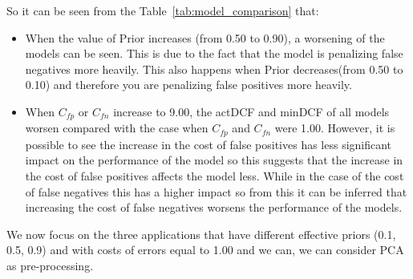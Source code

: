 \documentclass{article}
\begin{document}
    So it can be seen from the Table~\ref{tab:model_comparison} that:
    \begin{itemize}
        \item When the value of Prior increases (from 0.50 to 0.90), a worsening of the models can be seen. This is due to the fact that the model is penalizing false negatives more heavily. This also happens when Prior decreases(from 0.50 to 0.10) and therefore you are penalizing false positives more heavily.
        \item When \(C_{fp}\) or \(C_{fn}\) increase to 9.00, the actDCF and minDCF of all models worsen compared with the case when \(C_{fp}\) and \(C_{fn}\) were 1.00. However, it is possible to see the increase in the cost of false positives has less significant impact on the performance of the model so this suggests that the increase in the cost of false positives affects the model less.  While in the case of the cost of false negatives this has a higher impact so from this it can be inferred that increasing the cost of false negatives worsens the performance of the models.
    \end{itemize}
We now focus on the three applications that have different effective priors (0.1, 0.5, 0.9) and with costs of errors equal to 1.00 and we can, we can consider PCA as pre-processing.\\
\end{document}
